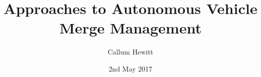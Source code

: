\documentclass{UoYCSproject}
\title{Approaches to Autonomous Vehicle Merge Management}
\author{Callum Hewitt}
\date{2nd May 2017}
\begin{document}
\maketitle
\listoffigures
\listoftables










\label{sec:Bibliography}


\end{document}
